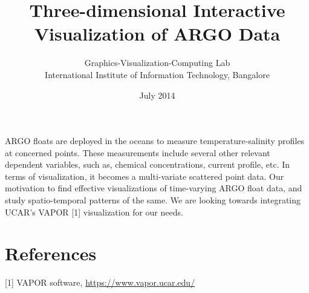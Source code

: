 \documentclass{article}
\title{Three-dimensional Interactive Visualization of ARGO Data}
\author{Graphics-Visualization-Computing Lab \\
International Institute of Information Technology, Bangalore}
\date{July 2014}
\begin{document}
\maketitle

ARGO floats are deployed in the oceans to measure temperature-salinity profiles
at concerned points. These measurements include several other relevant
dependent variables, such as, chemical concentrations, current profile, etc. In
terms of visualization, it becomes a multi-variate scattered point data. Our
motivation to find effective visualizations of time-varying ARGO float data,
and study spatio-temporal patterns of the same. We are looking towards
integrating UCAR's VAPOR [1] visualization for our needs.

\section*{References}
[1] VAPOR software, \href{https://www.vapor.ucar.edu/}{https://www.vapor.ucar.edu/}
\end{document}
